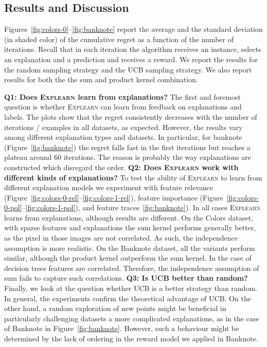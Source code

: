 \documentclass[letterpaper]{article} %
\newcommand{\explearn}{\textsc{Explearn}\xspace}
\newcommand{\colors}{{\sf Colors}\xspace}
\newcommand{\banknote}{{\sf Banknote}\xspace}
\begin{document}
\subsection{Results and Discussion}

Figures~\ref{fig:colors-0}--\ref{fig:banknote} report the average and the standard deviation (in shaded color) of the cumulative regret as a function of the number of iterations. Recall that in each iteration the algorithm receives an instance, selects an explanation and a prediction and receives a reward. We report the results for the random sampling strategy and the UCB sampling strategy. We also report results for both the the sum and product kernel combination.

\noindent\textbf{Q1: Does \explearn learn from explanations?}
%
The first and foremost question is whether \explearn can learn from feedback on explanations and labels. The plots show that the regret consistently decreases with the number of iterations / examples in all datasets, as expected. However, the results vary among different explanation types and datasets. In particular, for banknote (Figure~\ref{fig:banknote}) the regret falls fast in the first iterations but reaches a plateau around 60 iterations. The reason is probably the way explanations are constructed which disregard the order.
%
\noindent\textbf{Q2: Does \explearn work with different kinds of explanations?} 
%
To test the ability of \explearn to learn from different explanation models we experiment with feature relevance (Figure~\ref{fig:colors-0-rel}--\ref{fig:colors-1-rel}), feature importance (Figure~\ref{fig:colors-0-pol}--\ref{fig:colors-1-pol}), and feature traces~\ref{fig:banknote}). In all cases \explearn learns from explanations, although results are different. On the \colors dataset, with sparse features and explanations the sum kernel performs generally better, as the pixel in those images are not correlated. As such, the independence assumption is more realistic. On the \banknote dataset, all the variants perform similar, although the product kernel outperform the sum kernel. In the case of decision trees features are correlated. Therefore, the independence assumption of sum fails to capture such correlations. 
%
\noindent\textbf{Q3: Is UCB better than random?}
%
Finally, we look at the question whether UCB is a better strategy than random. In general, the experiments confirm the theoretical advantage of UCB. On the other hand, a random exploration of new points might be beneficial in particularly challenging datasets a more complicated explanations, as in the case of \banknote in Figure~\ref{fig:banknote}. However, such a behaviour might be determined by the lack of ordering in the reward model we applied in \banknote. 
\end{document}
